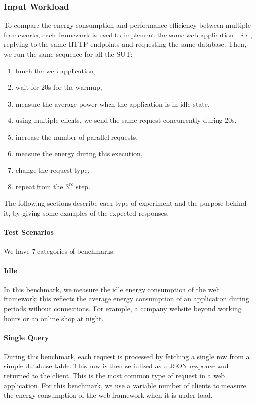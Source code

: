 \subsubsection{Input Workload}
To compare the energy consumption and performance efficiency between multiple frameworks, each framework is used to implement the same web application---\emph{i.e.}, replying to the same HTTP endpoints and requesting the same database. Then, we run the same sequence for all the SUT:
\begin{enumerate}
    \item lunch the web application,
    \item wait for 20s for the warmup,
    \item measure the average power when the application is in idle state,
    \item using multiple clients, we send the same request concurrently during 20s,
    \item increase the number of parallel requests,
    \item measure the energy during this execution,
    \item change the request type,
    \item repeat from the $3^{rd}$ step.
\end{enumerate}

The following sections describe each type of experiment and the purpose behind it, by giving some examples of the expected responses.

\paragraph{Test Scenarios}
We have 7 categories of benchmarks:
\paragraph{Idle}
In this benchmark, we measure the idle energy consumption of the web framework; this reflects the average energy consumption of an application during periods without connections.
For example, a company website beyond working hours or an online shop at night.

\paragraph{Single Query}
During this benchmark, each request is processed by fetching a single row from a simple database table.
This row is then serialized as a JSON response and returned to the client.
This is the most common type of request in a web application.
For this benchmark, we use a variable number of clients to measure the energy consumption of the web framework when it is under load.



